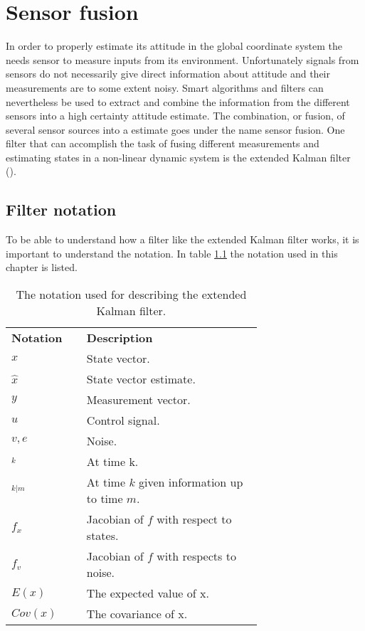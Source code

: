 \chapter{Sensor fusion}\label{cha:cha:sensor_fusion}
In order to properly estimate its attitude in the global coordinate system the \abbrROV needs sensor to measure inputs from its environment.
Unfortunately signals from sensors do not necessarily give direct information about attitude and their measurements are to some extent noisy. Smart algorithms and filters can nevertheless be used to extract and combine the information from the different sensors into a high certainty attitude estimate. The combination, or fusion, of several sensor sources into a estimate goes under the name sensor fusion. One filter that can accomplish the task of fusing different measurements and estimating states in a non-linear dynamic system is the extended Kalman filter (\abbrEKF). 
\section{Filter notation}
To be able to understand how a filter like the extended Kalman filter works, it is important to understand the notation. In table \ref{tab:notationKalman} the notation used in this chapter is listed.
 \begin{table}[htbp]
  \centering
  \caption{\label{tab:notationKalman}%
    The notation used for describing the extended Kalman filter.}
    \begin{tabular}{l p{0.7\linewidth}}
    \toprule%
    \textbf{Notation} & \textbf{Description} \\
    \otoprule%
    $x$ & State vector.\\
    $\hat{x}$ & State vector estimate.\\
    $y$    & Measurement vector.\\
    $u$ & Control signal.\\
    $v,e$ & Noise.\\
    $_k$ & At time k.\\
    $_{k|m}$ & At time $k$ given information up to time $m$.\\
    $f_x$ & Jacobian of $f$ with respect to states.\\
    $f_v$ & Jacobian of $f$ with respects to noise.\\
    $E(x)$ & The expected value of x.\\
    $Cov(x)$ & The covariance of x.\\
    \bottomrule%
 \end{tabular}
\end{table}

